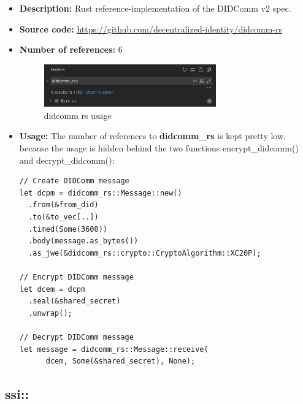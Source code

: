 \begin{itemize}
\item
  \textbf{Description:} Rust reference-implementation of the DIDComm v2
  spec.
\item
  \textbf{Source code:}
  \url{https://github.com/decentralized-identity/didcomm-rs}
\item
  \textbf{Number of references:} 6

  \begin{figure}
  \centering
  \includegraphics[width=0.7\textwidth]{Architecture 1442df162dbe45f4a423ba37d3e12363/Untitled 9.png}
  \caption{didcomm rs usage}
  \end{figure}
\item
  \textbf{Usage:} The number of references to \textbf{didcomm\_rs} is
  kept pretty low, because the usage is hidden behind the two functions
  encrypt\_didcomm() and decrypt\_didcomm():

\begin{lstlisting}
// Create DIDComm message
let dcpm = didcomm_rs::Message::new()
  .from(&from_did)
  .to(&to_vec[..])
  .timed(Some(3600))
  .body(message.as_bytes())
  .as_jwe(&didcomm_rs::crypto::CryptoAlgorithm::XC20P);

// Encrypt DIDComm message
let dcem = dcpm
  .seal(&shared_secret)
  .unwrap();

// Decrypt DIDComm message
let message = didcomm_rs::Message::receive(
      dcem, Some(&shared_secret), None);
\end{lstlisting}
\end{itemize}

\hypertarget{ssi}{%
\subsection{ssi::}\label{ssi}}

